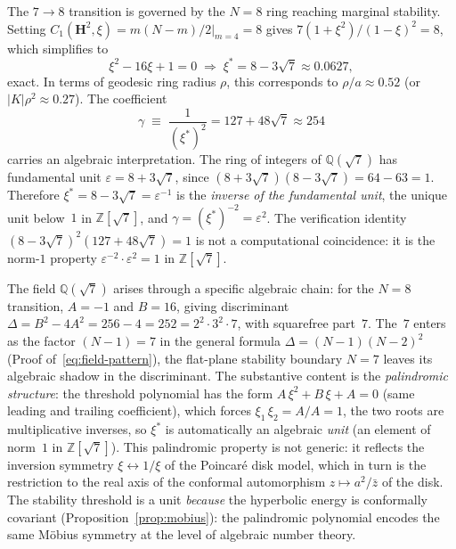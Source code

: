The $7\to 8$ transition is governed by the $N=8$ ring reaching marginal
stability.  Setting $C_1(\mathbf{H}^2,\xi) = m(N{-}m)/2\big|_{m=4} = 8$
gives $7(1+\xi^2)/(1-\xi)^2 = 8$, which simplifies to
\begin{equation}
  \xi^2 - 16\xi + 1 = 0
  \;\Longrightarrow\;
  \xi^* = 8 - 3\sqrt{7} \approx 0.0627 ,
  \label{eq:xi_star}
\end{equation}
exact.  In terms of geodesic ring radius $\rho$, this corresponds to
$\rho/a \approx 0.52$ (or $|K|\rho^2 \approx 0.27$).
The coefficient
\begin{equation}
  \gamma \;\equiv\; \frac{1}{(\xi^*)^2} = 127 + 48\sqrt{7} \approx 254
  \label{eq:gamma}
\end{equation}
carries an algebraic interpretation.
The ring of integers of $\mathbb{Q}(\sqrt{7})$ has fundamental unit
$\varepsilon = 8 + 3\sqrt{7}$, since $(8+3\sqrt{7})(8-3\sqrt{7}) = 64-63 = 1$.
Therefore $\xi^* = 8-3\sqrt{7} = \varepsilon^{-1}$ is the
\emph{inverse of the fundamental unit}, the unique unit below~$1$
in $\mathbb{Z}[\sqrt{7}]$, and $\gamma = (\xi^*)^{-2} = \varepsilon^2$.
The verification identity $(8-3\sqrt{7})^2(127+48\sqrt{7})=1$ is not a
computational coincidence: it is the norm-$1$ property
$\varepsilon^{-2}\cdot\varepsilon^2=1$ in $\mathbb{Z}[\sqrt{7}]$.

The field $\mathbb{Q}(\sqrt{7})$ arises through a specific algebraic
chain: for the $N = 8$ transition, $A = -1$ and $B = 16$, giving
discriminant $\Delta = B^2 - 4A^2 = 256 - 4 = 252 = 2^2 \cdot 3^2
\cdot 7$, with squarefree part~$7$.  The~$7$ enters as the factor
$(N{-}1) = 7$ in the general formula $\Delta = (N{-}1)(N{-}2)^2$
(Proof of~\eqref{eq:field-pattern}), the flat-plane stability
boundary $N = 7$ leaves its algebraic shadow in the discriminant.
The substantive content is the
\emph{palindromic structure}: the threshold polynomial has the form
$A\,\xi^2 + B\,\xi + A = 0$ (same leading and trailing coefficient),
which forces $\xi_1\,\xi_2 = A/A = 1$, the two roots are
multiplicative inverses, so $\xi^*$ is automatically an algebraic
\emph{unit} (an element of norm~$1$ in $\mathbb{Z}[\sqrt{7}]$).
This palindromic property is not generic: it reflects the inversion
symmetry $\xi\leftrightarrow 1/\xi$ of the Poincar\'e disk model,
which in turn is the restriction to the real axis of the conformal
automorphism $z \mapsto a^2/\bar z$ of the disk.  The stability
threshold is a unit \emph{because} the hyperbolic energy is
conformally covariant (Proposition~\ref{prop:mobius}): the palindromic
polynomial encodes the same M\"obius symmetry at the level of
algebraic number theory.

